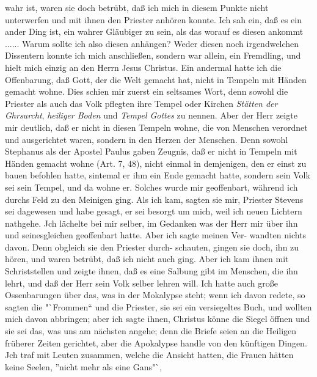wahr ist, waren sie doch betrübt, daß ich mich in diesem Punkte
nicht unterwerfen und mit ihnen den Priester anhören konnte.
Ich sah ein, daß es ein ander Ding ist, ein wahrer Gläubiger
zu sein, als das worauf es diesen ankommt ...... Warum sollte
ich also diesen anhängen? Weder diesen noch irgendwelchen
Dissentern konnte ich mich anschließen, sondern war allein, ein
Fremdling, und hielt mich einzig an den Herrn Jesus Christus.
Ein andermal hatte ich die Offenbarung, daß Gott, der die
Welt gemacht hat, nicht in Tempeln mit Händen gemacht wohne.
Dies schien mir zuerst ein seltsames Wort, denn sowohl die
Priester als auch das Volk pflegten ihre Tempel oder Kirchen
\textit{Stätten der Ghrsurcht}, \textit{heiliger Boden} und \textit{Tempel Gottes}
zu nennen. Aber der Herr zeigte mir deutlich, daß er nicht
in diesen Tempeln wohne, die von Menschen verordnet und
ausgerichtet waren, sondern in den Herzen der Menschen. Denn
sowohl Stephanus als der Apostel Paulus gaben Zeugnis,
daß er nicht in Tempeln mit Händen gemacht wohne (Art. 7, 48),
nicht einmal in demjenigen, den er einst zu bauen befohlen hatte,
sintemal er ihm ein Ende gemacht hatte, sondern sein Volk sei
sein Tempel, und da wohne er. Solches wurde mir geoffenbart,
während ich durchs Feld zu den Meinigen ging. Als ich kam,
sagten sie mir, Priester Stevens sei dagewesen und habe gesagt,
er sei besorgt um mich, weil ich neuen Lichtern nathgehe. Jch
lächelte bei mir selber, im Gedanken was der Herr mir über ihn
und seinesgleichen geoffenbart hatte. Aber ich sagte meinen Ver-
wandten nichts davon. Denn obgleich sie den Priester durch-
schauten, gingen sie doch, ihn zu hören, und waren betrübt, daß
ich nicht auch ging. Aber ich kam ihnen mit Schriststellen und
zeigte ihnen, daß es eine Salbung gibt im Menschen, die ihn
lehrt, und daß der Herr sein Volk selber lehren will. Ich hatte
auch große Ossenbarungen über das, was in der Mokalypse steht;
wenn ich davon redete, so sagten die "`Frommen"` und die Priester,
sie sei ein versiegeltes Buch, und wollten mich davon abbringen;
aber ich sagte ihnen, Christus könne die Siegel öffnen und sie
sei das, was uns am nächsten angehe; denn die Briefe seien an
die Heiligen früherer Zeiten gerichtet, aber die Apokalypse handle
von den künftigen Dingen.
Jch traf mit Leuten zusammen, welche die Ansicht hatten,
die Frauen hätten keine Seelen, "'nicht mehr als eine Gans"`,



